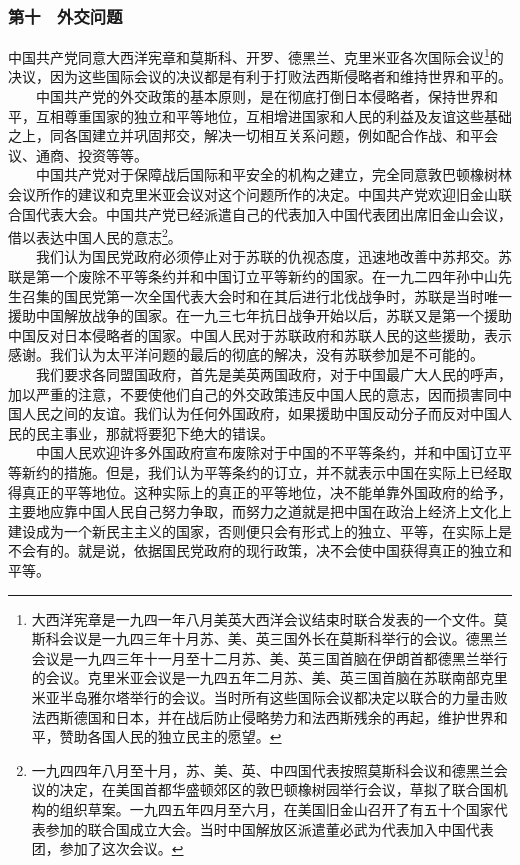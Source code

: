 \documentclass[cn,11pt,chinese]{elegantbook}
\def\myformat#1{\hfil\hfil #1}
\begin{document}
\subsubsection*{\myformat{第十　外交问题}}
中国共产党同意大西洋宪章和莫斯科、开罗、德黑兰、克里米亚各次国际会议\footnote[27]{ 大西洋宪章是一九四一年八月美英大西洋会议结束时联合发表的一个文件。莫斯科会议是一九四三年十月苏、美、英三国外长在莫斯科举行的会议。德黑兰会议是一九四三年十一月至十二月苏、美、英三国首脑在伊朗首都德黑兰举行的会议。克里米亚会议是一九四五年二月苏、美、英三国首脑在苏联南部克里米亚半岛雅尔塔举行的会议。当时所有这些国际会议都决定以联合的力量击败法西斯德国和日本，并在战后防止侵略势力和法西斯残余的再起，维护世界和平，赞助各国人民的独立民主的愿望。}的决议，因为这些国际会议的决议都是有利于打败法西斯侵略者和维持世界和平的。\\
　　中国共产党的外交政策的基本原则，是在彻底打倒日本侵略者，保持世界和平，互相尊重国家的独立和平等地位，互相增进国家和人民的利益及友谊这些基础之上，同各国建立并巩固邦交，解决一切相互关系问题，例如配合作战、和平会议、通商、投资等等。\\
　　中国共产党对于保障战后国际和平安全的机构之建立，完全同意敦巴顿橡树林会议所作的建议和克里米亚会议对这个问题所作的决定。中国共产党欢迎旧金山联合国代表大会。中国共产党已经派遣自己的代表加入中国代表团出席旧金山会议，借以表达中国人民的意志\footnote[28]{ 一九四四年八月至十月，苏、美、英、中四国代表按照莫斯科会议和德黑兰会议的决定，在美国首都华盛顿郊区的敦巴顿橡树园举行会议，草拟了联合国机构的组织草案。一九四五年四月至六月，在美国旧金山召开了有五十个国家代表参加的联合国成立大会。当时中国解放区派遣董必武为代表加入中国代表团，参加了这次会议。}。\\
　　我们认为国民党政府必须停止对于苏联的仇视态度，迅速地改善中苏邦交。苏联是第一个废除不平等条约并和中国订立平等新约的国家。在一九二四年孙中山先生召集的国民党第一次全国代表大会时和在其后进行北伐战争时，苏联是当时唯一援助中国解放战争的国家。在一九三七年抗日战争开始以后，苏联又是第一个援助中国反对日本侵略者的国家。中国人民对于苏联政府和苏联人民的这些援助，表示感谢。我们认为太平洋问题的最后的彻底的解决，没有苏联参加是不可能的。\\
　　我们要求各同盟国政府，首先是美英两国政府，对于中国最广大人民的呼声，加以严重的注意，不要使他们自己的外交政策违反中国人民的意志，因而损害同中国人民之间的友谊。我们认为任何外国政府，如果援助中国反动分子而反对中国人民的民主事业，那就将要犯下绝大的错误。\\
　　中国人民欢迎许多外国政府宣布废除对于中国的不平等条约，并和中国订立平等新约的措施。但是，我们认为平等条约的订立，并不就表示中国在实际上已经取得真正的平等地位。这种实际上的真正的平等地位，决不能单靠外国政府的给予，主要地应靠中国人民自己努力争取，而努力之道就是把中国在政治上经济上文化上建设成为一个新民主主义的国家，否则便只会有形式上的独立、平等，在实际上是不会有的。就是说，依据国民党政府的现行政策，决不会使中国获得真正的独立和平等。\\
\end{document}
